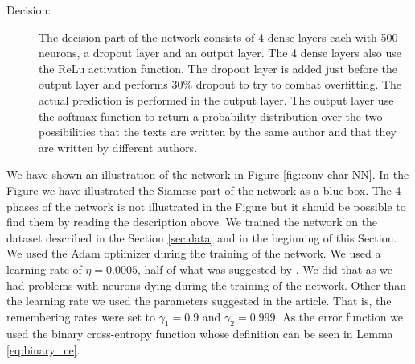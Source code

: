 \begin{description}
    \item[Decision:]

        The decision part of the network consists of 4 dense layers each with
        500 neurons, a dropout layer and an output layer. The 4 dense layers
        also use the \gls{ReLu} activation function. The dropout layer is added
        just before the output layer and performs 30\% dropout to try to combat
        overfitting. The actual prediction is performed in the output layer.
        The output layer use the softmax function to return a probability
        distribution over the two possibilities that the texts are written by
        the same author and that they are written by different authors.

\end{description}

We have shown an illustration of the network in Figure \ref{fig:conv-char-NN}.
In the Figure we have illustrated the Siamese part of the network as a blue box.
The 4 phases of the network is not illustrated in the Figure but it should be
possible to find them by reading the description above. We trained the network
on the dataset described in the Section \ref{sec:data} and in the beginning
of this Section. We used the \gls{Adam} optimizer during the training of the
network. We used a learning rate of $\eta = 0.0005$, half of what was suggested
by \citet{DBLP:journals/corr/KingmaB14}. We did that as we had problems with
neurons dying during the training of the network. Other than the learning rate
we used the parameters suggested in the article. That is, the remembering rates
were set to $\gamma_1 = 0.9$ and $\gamma_2 = 0.999$. As the error function we
used the binary cross-entropy function whose definition can be seen in Lemma
\eqref{eq:binary_ce}.

